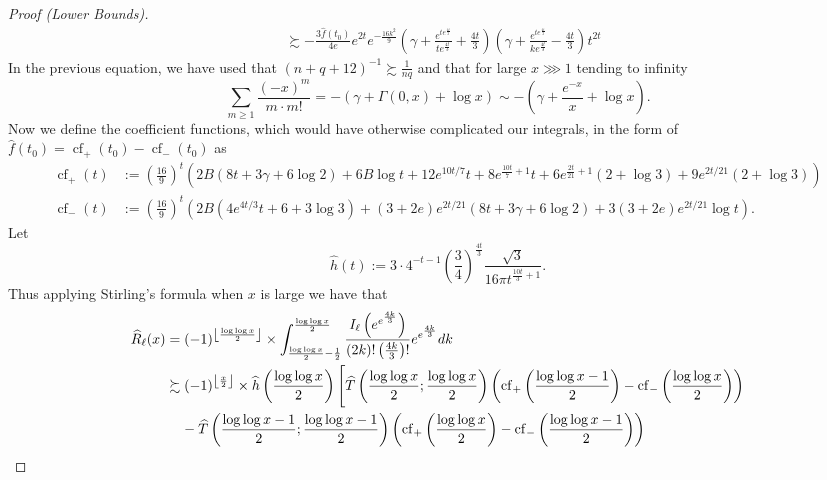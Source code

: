 \documentclass[11pt,reqno,a4letter]{article}
\numberwithin{figure}{section}
\numberwithin{table}{section}
\newcommand{\Floor}[2]{\ensuremath{\left\lfloor \frac{#1}{#2} \right\rfloor}}
\theoremstyle{plain}
\numberwithin{theorem}{section}
\theoremstyle{definition}
\begin{document}
\begin{proof}[Proof (Lower Bounds)]
\begin{align*}
     & \succsim 
     -\frac{3 \widehat{f}(t_0)}{4e} e^{2t} e^{-\frac{16 k^2}{9}} \left( 
     \gamma + \frac{e^{te^{\frac{4t}{3}}}}{t e^{\frac{4t}{3}}} + \frac{4t}{3}
     \right) \left(
     \gamma + \frac{e^{te^{\frac{4t}{3}}}}{k e^{\frac{4t}{3}}} - \frac{4t}{3} 
     \right) t^{2t} 
\end{align*} 
In the previous equation, we have used that $(n+q+12)^{-1} \succsim \frac{1}{nq}$ and that 
for large $x \ggg 1$ tending to infinity 
\[
\sum_{m \geq 1} \frac{(-x)^m}{m \cdot m!} = -\left(\gamma + \Gamma(0, x) + \log x\right) \sim 
     -\left(\gamma + \frac{e^{-x}}{x} + \log x\right). 
\]
Now we define the coefficient functions, which would have otherwise complicated our integrals, 
in the form of $\widehat{f}(t_0) = \operatorname{cf}_{+}(t_0) - \operatorname{cf}_{-}(t_0)$ as 
\begin{align*}
\operatorname{cf}_{+}(t) & := \left(\frac{16}{9}\right)^t \left(2 B (8 t+3 \gamma +
     6 \log 2)+6 B \log t+12 e^{10 t/7} t+8 e^{\frac{10 t}{7}+1} t+6 e^{\frac{2 t}{21}+1}
     (2+\log 3)+9 e^{2 t/21} (2+\log 3)\right)\\ 
\operatorname{cf}_{-}(t) & := \left(\frac{16}{9}\right)^t \left(2 B \left(4 e^{4 t/3} t+6+3 
     \log 3\right)+(3+2 e) e^{2 t/21} (8 t+3 \gamma +6 \log 2)+3 (3+2 e) e^{2 t/21}
     \log t\right). 
\end{align*} 
Let 
\[
\widehat{h}(t) := 3 \cdot 4^{-t-1} \left(\frac{3}{4}\right)^{\frac{4t}{3}} \frac{\sqrt{3}}{ 
     16\pi t^{\frac{10t}{3}+1}}. 
\]
Thus applying Stirling's formula when $x$ is large we have that 
\begin{align} 
\label{proof_thm_GInvFunc_v2}  
\widehat{R}_{\ell}(x) & = (-1)^{\Floor{\log\log x}{2}} \times 
     \int_{\frac{\log\log x}{2}-\frac{1}{2}}^{\frac{\log\log x}{2}} 
     \frac{I_{\ell}\left(e^{e^{\frac{4k}{3}}}\right)}{(2k)! \left(\frac{4k}{3}\right)!} 
     e^{e^{\frac{4k}{3}}} dk \\ 
\notag 
     & \succsim (-1)^{\Floor{x}{2}} \times \widehat{h}\left(\frac{\log\log x}{2}\right) \Biggl[ 
     \widehat{T}\left(\frac{\log\log x}{2}; \frac{\log\log x}{2}\right) \left( 
     \operatorname{cf}_{+}\left(\frac{\log\log x-1}{2}\right) - 
     \operatorname{cf}_{-}\left(\frac{\log\log x}{2}\right)
     \right) \\ 
\notag 
     & \phantom{\succsim\ } - 
     \widehat{T}\left(\frac{\log\log x-1}{2}; \frac{\log\log x-1}{2}\right) \left( 
     \operatorname{cf}_{+}\left(\frac{\log\log x}{2}\right) - 
     \operatorname{cf}_{-}\left(\frac{\log\log x-1}{2}\right)
     \right) 

\end{align}
\end{proof}
\end{document}
